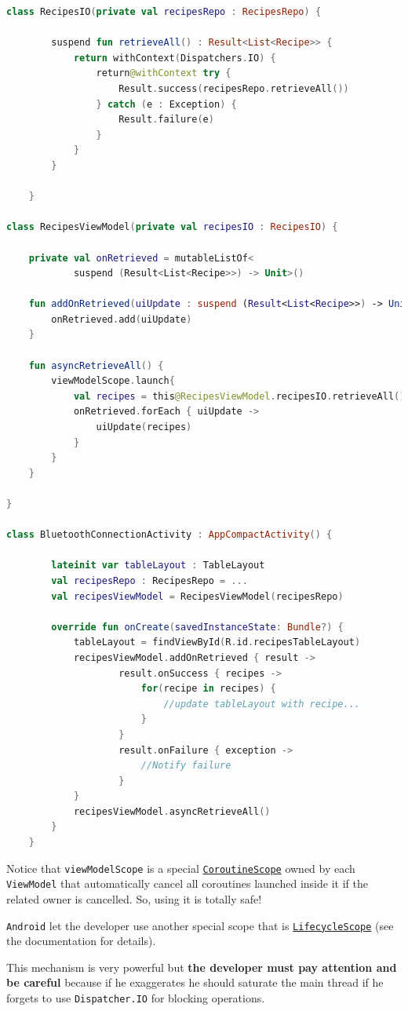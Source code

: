 \begin{lstlisting}[language=Kotlin]
	class RecipesIO(private val recipesRepo : RecipesRepo) {
		
		suspend fun retrieveAll() : Result<List<Recipe>> {
			return withContext(Dispatchers.IO) {
				return@withContext try {
					Result.success(recipesRepo.retrieveAll())
				} catch (e : Exception) {
					Result.failure(e)
				}
			}
		}
				
	}

class RecipesViewModel(private val recipesIO : RecipesIO) {
	
	private val onRetrieved = mutableListOf<
			suspend (Result<List<Recipe>>) -> Unit>()
	
	fun addOnRetrieved(uiUpdate : suspend (Result<List<Recipe>>) -> Unit) {
		onRetrieved.add(uiUpdate)
	}
	
	fun asyncRetrieveAll() {
		viewModelScope.launch{
			val recipes = this@RecipesViewModel.recipesIO.retrieveAll()
			onRetrieved.forEach { uiUpdate ->
				uiUpdate(recipes)
			}
		}
	}
	
}
	
class BluetoothConnectionActivity : AppCompactActivity() {
		
		lateinit var tableLayout : TableLayout
		val recipesRepo : RecipesRepo = ...
		val recipesViewModel = RecipesViewModel(recipesRepo)
		
		override fun onCreate(savedInstanceState: Bundle?) {
			tableLayout = findViewById(R.id.recipesTableLayout)
			recipesViewModel.addOnRetrieved { result ->
					result.onSuccess { recipes ->
						for(recipe in recipes) {
							//update tableLayout with recipe...
						}
					}
					result.onFailure { exception ->
						//Notify failure 
					}
			}
			recipesViewModel.asyncRetrieveAll()
		}
	}
\end{lstlisting}

Notice that \texttt{viewModelScope} is a special \href{https://kotlinlang.org/api/kotlinx.coroutines/kotlinx-coroutines-core/kotlinx.coroutines/-coroutine-scope/}{\texttt{CoroutineScope}} owned by each \texttt{ViewModel} that automatically cancel all coroutines launched inside it if the related owner is cancelled. So, using it is totally safe!

\texttt{Android} let the developer use another special scope that is \href{https://developer.android.com/topic/libraries/architecture/coroutines#lifecyclescope}{\texttt{LifecycleScope}} (see the documentation for details).

This mechanism is very powerful but \textbf{the developer must pay attention and be careful} because if he exaggerates he should saturate the main thread if he forgets to use  \texttt{Dispatcher.IO} for blocking operations.

